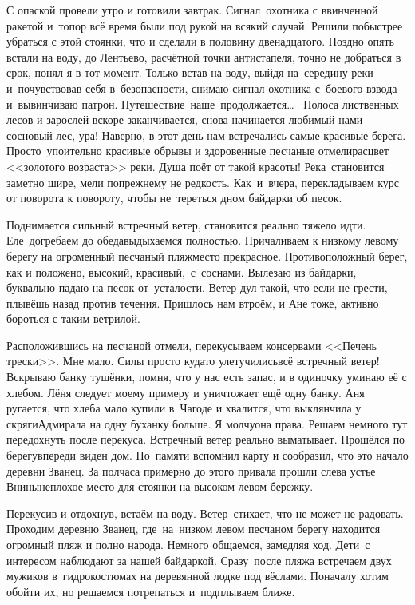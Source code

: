С опаской провели утро и готовили завтрак. Сигнал~охотника с ввинченной ракетой и~топор всё время были под рукой на всякий случай. Решили побыстрее убраться с этой стоянки, что и сделали в половину двенадцатого. Поздно опять встали на воду, до Лентьево, расчётной точки антистапеля, точно не добраться в срок, понял я в тот момент. Только встав на воду, выйдя на~середину реки и~почувствовав себя в~безопасности, снимаю сигнал охотника с~боевого взвода и~вывинчиваю патрон. Путешествие~наше~продолжается\ldots~
\newpage 
Полоса лиственных лесов и зарослей вскоре заканчивается, снова начинается любимый нами сосновый лес, ура! Наверно, в этот день нам встречались самые красивые берега. Просто~упоительно красивые обрывы и здоровенные песчаные отмели\mdash расцвет <<золотого возраста>> реки. Душа поёт от такой красоты! Река~становится заметно шире, мели по\sdash прежнему не редкость. Как~и~вчера, перекладываем курс от поворота к повороту, чтобы не~тереться дном байдарки об песок. 

Поднимается сильный встречный ветер, становится реально тяжело идти. Еле~догребаем до обеда\mdash выдыхаемся полностью. Причаливаем к низкому левому берегу на огроменный песчаный пляж\mdash место прекрасное. Противоположный берег, как и положено, высокий, красивый,~с~соснами. Вылезаю из байдарки, буквально падаю на песок от~усталости. Ветер дул такой, что если не грести, плывёшь назад против течения. Пришлось нам втроём, и Ане тоже, активно бороться с таким ветрилой. 

Расположившись на песчаной отмели, перекусываем консервами <<Печень трески>>. Мне мало. Силы просто куда\sdash то улетучились\mdash всё встречный ветер! Вскрываю банку тушёнки, помня, что у нас есть запас, и в одиночку уминаю её с хлебом. Лёня следует моему примеру и уничтожает ещё одну банку. Аня ругается, что хлеба мало купили в~Чагоде и хвалится, что выклянчила у скряги\sdash Адмирала на одну буханку больше. Я молчу\mdash она права. Решаем немного тут передохнуть после перекуса. Встречный ветер реально выматывает. Прошёлся по берегу\mdash впереди виден дом. По~памяти вспомнил карту и сообразил, что это начало деревни Званец. За полчаса примерно до этого привала прошли слева устье Внины\mdash неплохое место для стоянки на высоком левом бережку. 

Перекусив и отдохнув, встаём на воду. Ветер~стихает, что не может не радовать. Проходим деревню Званец, где~на~низком левом песчаном берегу находится огромный пляж и полно народа. Немного общаемся, замедляя ход. Дети~с интересом наблюдают за нашей байдаркой. Сразу~после пляжа встречаем двух мужиков в~гидрокостюмах на деревянной лодке под вёслами. Поначалу хотим обойти их, но решаемся потрепаться и~подплываем ближе. 

